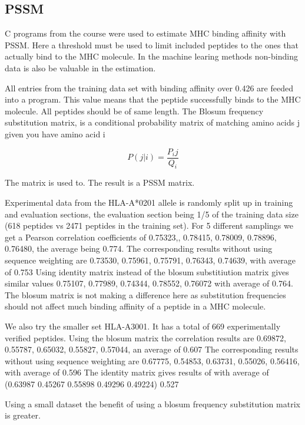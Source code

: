 
\subsection{PSSM}

C programs from the course were used to estimate MHC binding affinity with PSSM. 
Here a threshold must be used to limit included peptides to the ones that actually bind to the MHC molecule. 
In the machine learing methods non-binding data is also be valuable in the estimation.

All entries from the training data set with binding affinity over 0.426 are feeded into a program. 
This value means that the peptide successfully binds to the MHC molecule. All peptides should be of same length.
The Blosum frequency substitution matrix, is a
conditional probability matrix of matching amino
acids j given you have amino acid i

\begin{equation}
P(j|i) = \frac{P_ij}{Q_i}
\end{equation}

The matrix is used to. The result is a PSSM matrix. 

Experimental data from the HLA-A*0201 allele is randomly split up in training and evaluation sections, the evaluation section being 1/5 of the training data size (618 peptides vs 2471 peptides in the training set).
For 5 different samplings we get a Pearson correlation coefficients of {0.75323,, 0.78415, 0.78009, 0.78896, 0.76480}, the average being 0.774.
The corresponding results without using sequence weighting are {0.73530, 0.75961, 0.75791, 0.76343, 0.74639}, with average of 0.753
Using identity matrix instead of the blosum substitiution matrix gives similar values {0.75107, 0.77989, 0.74344, 0.78552, 0.76072} with average of 0.764.
The blosum matrix is not making a difference here as substitution frequencies should not affect much binding affinity of a peptide in a MHC molecule.

We also try the smaller set HLA-A3001. It has a total of 669 experimentally verified peptides.
Using the blosum matrix the correlation results are {0.69872, 0.55787, 0.65032, 0.55827, 0.57044}, an average of 0.607
The corresponding results without using sequence weighting are {0.67775, 0.54853, 0.63731, 0.55026, 0.56416}, with average of 0.596
The identity matrix gives results of with average of (0.63987 0.45267 0.55898 0.49296 0.49224) 0.527 

Using a small dataset the benefit of using a blosum frequency substitution matrix is greater.

